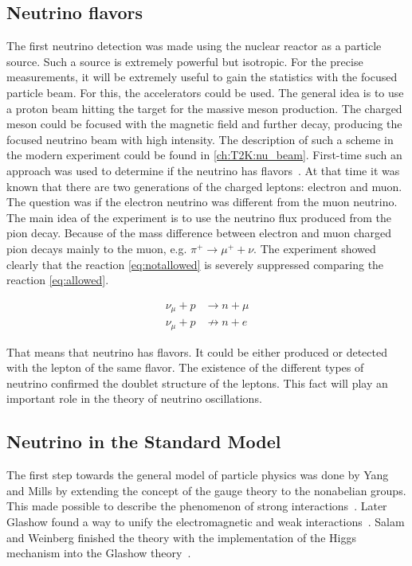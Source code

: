 \documentclass[../main.tex]{subfiles}
\begin{document}
\subsection{Neutrino flavors}
\label{sec:dublet}
The first neutrino detection was made using the nuclear reactor as a particle source. Such a source is extremely powerful but isotropic. For the precise measurements, it will be extremely useful to gain the statistics with the focused particle beam. For this, the accelerators could be used. The general idea is to use a proton beam hitting the target for the massive meson production. The charged meson could be focused with the magnetic field and further decay, producing the focused neutrino beam with high intensity. The description of such a scheme in the modern experiment could be found in \autoref{ch:T2K:nu_beam}. First-time such an approach was used to determine if the neutrino has flavors~\cite{Danby1962}. At that time it was known that there are two generations of the charged leptons: electron and muon. The question was if the electron neutrino was different from the muon neutrino. The main idea of the experiment is to use the neutrino flux produced from the pion decay. Because of the mass difference between electron and muon charged pion decays mainly to the muon, e.g. $\pi^+\to\mu^++\nu$. The experiment showed clearly that the reaction \autoref{eq:notallowed} is severely suppressed comparing the reaction \autoref{eq:allowed}.

\begin{align}
\label{eq:allowed}
\nu_\mu+p&\rightarrow n+\mu \\
\nu_\mu+p&\nrightarrow n+e
\label{eq:notallowed}
\end{align}

That means that neutrino has flavors. It could be either produced or detected with the lepton of the same flavor. The existence of the different types of neutrino confirmed the doublet structure of the leptons. This fact will play an important role in the theory of neutrino oscillations.

\subsection{Neutrino in the Standard Model}
\label{sec:sm}

The first step towards the general model of particle physics was done by Yang and Mills by extending the concept of the gauge theory to the nonabelian groups. This made possible to describe the phenomenon of strong interactions~\cite{Yang1954}. Later Glashow found a way to unify the electromagnetic and weak interactions~\cite{Glashow1961}. Salam and Weinberg finished the theory with the implementation of the Higgs mechanism into the Glashow theory~\cite{Weinberg1967}.
\end{document}
